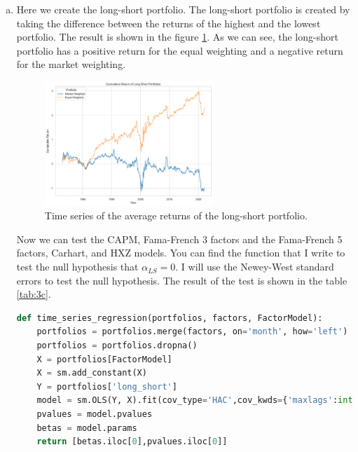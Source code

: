 \begin{enumerate}[(a)]
\begin{table}[htbp!]
    \centering
    \caption{Average returns of the portfolios with different weighting}
    \label{tab:3b}
    
\end{table}

\item Here we create the long-short portfolio. The long-short portfolio is created by taking the difference between the returns of the highest and the lowest portfolio. The result is shown in the figure \ref{fig:3c}. As we can see, the long-short portfolio has a positive return for the equal weighting and a negative return for the market weighting.

\begin{figure}[htbp!]
    \centering
    \includegraphics[width=0.6\textwidth]{Out/3_3.pdf}
    \caption{Time series of the average returns of the long-short portfolio.}
    \label{fig:3c}
\end{figure}

Now we can test the CAPM, Fama-French 3 factors and the Fama-French 5 factors, Carhart, and HXZ models. You can find the function that I write to test the null hypothesis that $\alpha_{LS} =0$. I will use the Newey-West standard errors to test the null hypothesis. The result of the test is shown in the table \ref{tab:3c}.


\begin{lstlisting}[language=Python, caption= Python function to run the test, label={pcode:3a}, escapechar=|, frame=single, basicstyle=\small, showstringspaces=false, captionpos=b, breaklines=true, showspaces=false, showtabs=false, keywordstyle=\color{blue}, commentstyle=\color{gray}]
    def time_series_regression(portfolios, factors, FactorModel):
    portfolios = portfolios.merge(factors, on='month', how='left')
    portfolios = portfolios.dropna()
    X = portfolios[FactorModel]
    X = sm.add_constant(X)
    Y = portfolios['long_short']
    model = sm.OLS(Y, X).fit(cov_type='HAC',cov_kwds={'maxlags':int(len(Y)**0.25)}) 
    pvalues = model.pvalues
    betas = model.params
    return [betas.iloc[0],pvalues.iloc[0]]
\end{lstlisting}


\end{enumerate}
